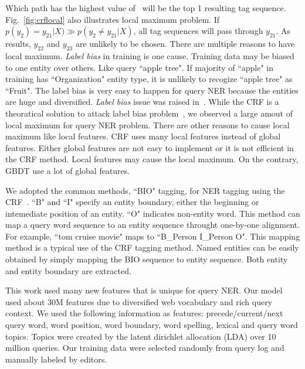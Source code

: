 \documentclass[11pt]{article}
\begin{document}
Which path has the highest value of~\label{eq:crf} will be  the top 1 resulting tag sequence. Fig.~\ref{fig:crflocal} also illustrates local maximum problem. If $p(y_2)=y_{21}|X)\gg p(y_2\neq y_{21}|X)$, all tag sequences will pass through $y_{21}$. As results, $y_{22}$ and $y_{23}$ are unlikely to be chosen. There are multiple reasons to have local maximum. \textit{Label bias} in training is one cause. Training data may  be biased to one entity over others. Like query ``apple tree". If majority of ``apple" in training has ``Organization" entity type, it is unlikely to recogize ``apple tree" as ``Fruit". The label bias  is very easy to happen for query NER because the entities are huge and diversified.  \textit{Label bias} issue was raised in~\cite{lafferty:2001}. While the CRF is a theoratical solution to attack label bias problem~\cite{lafferty:2001}, we observed a large amout of  local maximum for query NER problem. There are other reasons to cause local maximum like local features.   
CRF uses many local features instead of global features. Either global features are not easy to implement or it is not efficient in the CRF method. Local features may cause the local maximum. On the contrary, GBDT use  a lot of global features.    



We adopted the common methods, ``BIO" tagging, for NER tagging using the CRF~\cite{Xue:2003:CWS:1119250.1119278}. ``B" and ``I" specify an entity boundary, either the beginning or intemediate position of an entity. ``O" indicates non-entity word.  This method can map a query word sequence to an entity sequence throught one-by-one alignment.
For example, ``tom cruise movie" maps to ``B\_Person I\_Person O". This mapping method is a typical use of  the CRF tagging method.
Named entities can be easily obtained by simply mapping the BIO sequence to entity sequence. Both entity and entity boundary are extracted.  

This work used many new features that is unique for query NER. Our model used about 30M features due to diversified web vocabulary and rich query context. We used the following information as features: precede/current/next query word, word position, word boundary, word spelling, lexical and query word topics. Topics were created by the latent dirichlet allocation (LDA) over 10 million queries. Our training data were selected randomly from query log and manually labeled by editors. 
\end{document}
